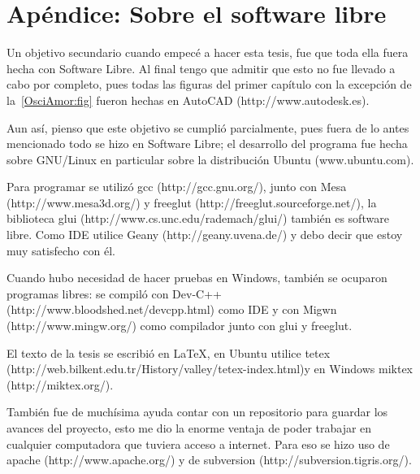 \chapter*{Apéndice: Sobre el software libre}
Un objetivo secundario cuando empecé a hacer esta tesis, fue que toda ella fuera hecha con Software Libre. Al final tengo que admitir que esto no fue llevado a cabo por completo, pues todas las figuras del primer capítulo con la excepción de la~\ref{OsciAmor:fig} fueron hechas en AutoCAD (http://www.autodesk.es).

Aun así, pienso que este objetivo se cumplió parcialmente, pues fuera de lo antes mencionado todo se hizo en Software Libre; el desarrollo del programa fue hecha sobre GNU/Linux en particular sobre la distribución Ubuntu (www.ubuntu.com).

Para programar se utilizó gcc (http://gcc.gnu.org/), junto con Mesa (http://www.mesa3d.org/) y freeglut (http://freeglut.sourceforge.net/), la biblioteca glui (http://www.cs.unc.edu/rademach/glui/) también es software libre. Como IDE utilice Geany (http://geany.uvena.de/) y debo decir que estoy muy satisfecho con él.

Cuando hubo necesidad de hacer pruebas en Windows, también se ocuparon programas libres: se compiló con Dev-C++ (http://www.bloodshed.net/devcpp.html) como IDE y con Migwn (http://www.mingw.org/) como compilador junto con glui y freeglut.

El texto de la tesis se escribió en \LaTeX, en Ubuntu utilice tetex (http://web.bilkent.edu.tr/History/valley/tetex-index.html)y en Windows miktex (http://miktex.org/).

También fue de muchísima ayuda contar con un repositorio para guardar los avances del proyecto, esto me dio la enorme ventaja de poder trabajar en cualquier computadora que tuviera acceso a internet. Para eso se hizo uso de apache (http://www.apache.org/) y de subversion (http://subversion.tigris.org/).
